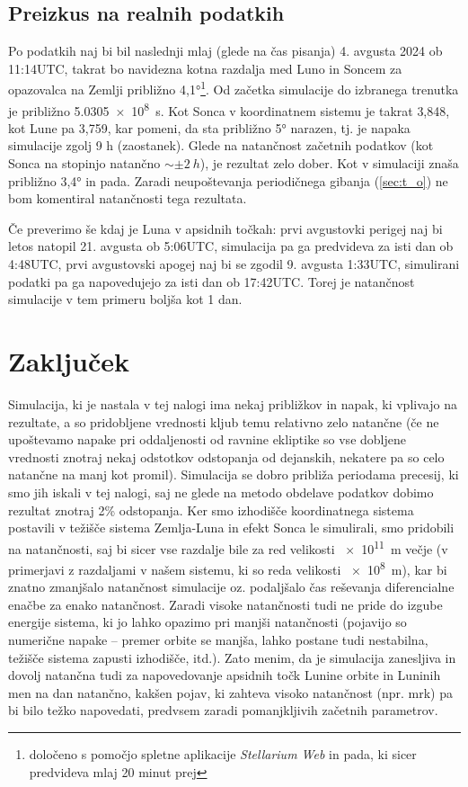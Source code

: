 \documentclass{article}
\begin{document}
\subsection{Preizkus na realnih podatkih}
Po podatkih \cite{apsid_calc} naj bi bil naslednji mlaj (glede na čas pisanja) 4. avgusta 2024 ob 11:14UTC, takrat bo navidezna kotna razdalja med Luno in Soncem za opazovalca na Zemlji približno \ang{4,1}\footnote{določeno s pomočjo spletne aplikacije \textit{Stellarium Web} in pada, ki sicer predvideva mlaj 20 minut prej}. Od začetka simulacije do izbranega trenutka je približno \SI{5,0305e8}{\second}. Kot Sonca v koordinatnem sistemu je takrat {3,848}, kot Lune pa {3,759}, kar pomeni, da sta približno \ang{5} narazen, tj. je napaka simulacije zgolj 9 h (zaostanek). Glede na natančnost začetnih podatkov (kot Sonca na stopinjo natančno $\sim \pm\SI{2}{h}$), je rezultat zelo dober. Kot v simulaciji znaša približno \ang{3,4} in pada. Zaradi neupoštevanja periodičnega gibanja (\ref{sec:t_o}) ne bom komentiral natančnosti tega rezultata.

Če preverimo še kdaj je Luna v apsidnih točkah: prvi avgustovki perigej naj bi letos natopil 21. avgusta ob 5:06UTC, simulacija pa ga predvideva za isti dan ob 4:48UTC, prvi avgustovski apogej naj bi se zgodil 9. avgusta 1:33UTC, simulirani podatki pa ga napovedujejo za isti dan ob 17:42UTC. Torej je natančnost simulacije v tem primeru boljša kot 1 dan.
\section{Zaključek}
Simulacija, ki je nastala v tej nalogi ima nekaj približkov in napak, ki vplivajo na rezultate, a so pridobljene vrednosti kljub temu relativno zelo natančne (če ne upoštevamo napake pri oddaljenosti od ravnine ekliptike so vse dobljene vrednosti znotraj nekaj odstotkov odstopanja od dejanskih, nekatere pa so celo natančne na manj kot promil). Simulacija se dobro približa periodama precesij, ki smo jih iskali v tej nalogi, saj ne glede na metodo obdelave podatkov dobimo rezultat znotraj 2\% odstopanja. Ker smo izhodišče koordinatnega sistema postavili v težišče sistema Zemlja-Luna in efekt Sonca le simulirali, smo pridobili na natančnosti, saj bi sicer vse razdalje bile za red velikosti \SI{e11}{\meter} večje (v primerjavi z razdaljami v našem sistemu, ki so reda velikosti \SI{e8}{\meter}), kar bi znatno zmanjšalo natančnost simulacije oz. podaljšalo čas reševanja diferencialne enačbe za enako natančnost. Zaradi visoke natančnosti tudi ne pride do izgube energije sistema, ki jo lahko opazimo pri manjši natančnosti (pojavijo so numerične napake -- premer orbite se manjša, lahko postane tudi nestabilna, težišče sistema zapusti izhodišče, itd.). Zato menim, da je simulacija zanesljiva in dovolj natančna tudi za napovedovanje apsidnih točk Lunine orbite in Luninih men na dan natančno, kakšen pojav, ki zahteva visoko natančnost (npr. mrk) pa bi bilo težko napovedati, predvsem zaradi pomanjkljivih začetnih parametrov.
\end{document}
